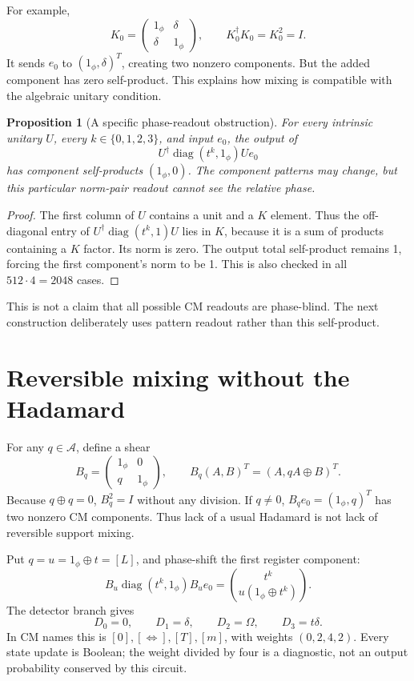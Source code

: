 \documentclass[11pt,a4paper]{article}
\newtheorem{proposition}[theorem]{Proposition}
\theoremstyle{definition}\newtheorem{definition}[theorem]{Definition}
\theoremstyle{remark}\newtheorem{remark}[theorem]{Remark}
\newcommand{\alg}{\mathcal A}
\newcommand{\diag}{\operatorname{diag}}
\newcommand{\cm}[4]{\begin{pmatrix}#1&#2\\#3&#4\end{pmatrix}}
\newcommand{\one}{1_{\phi}}
\numberwithin{equation}{section}
\begin{document}
For example,
\begin{equation}\label{eq:Kgate}
 K_0=\cm{\one}{\delta}{\delta}{\one},\qquad K_0^\dagger K_0=K_0^2=I.
\end{equation}
It sends $e_0$ to $(\one,\delta)^T$, creating two nonzero components. But the added component has zero self-product. This explains how mixing is compatible with the algebraic unitary condition.

\begin{proposition}[A specific phase-readout obstruction]\label{prop:unitaryblind}
For every intrinsic unitary $U$, every $k\in\{0,1,2,3\}$, and input $e_0$, the output of
\begin{equation}
 U^\dagger\diag(t^k,\one)Ue_0
\end{equation}
has component self-products $(\one,0)$. The component patterns may change, but this particular norm-pair readout cannot see the relative phase.
\end{proposition}
\begin{proof}
The first column of $U$ contains a unit and a $K$ element. Thus the off-diagonal entry of $U^\dagger\diag(t^k,1)U$ lies in $K$, because it is a sum of products containing a $K$ factor. Its norm is zero. The output total self-product remains 1, forcing the first component's norm to be 1. This is also checked in all $512\cdot4=2048$ cases.
\end{proof}
This is not a claim that all possible CM readouts are phase-blind. The next construction deliberately uses pattern readout rather than this self-product.

\section{Reversible mixing without the Hadamard}\label{sec:shears}
For any $q\in\alg$, define a shear
\begin{equation}\label{eq:shear}
 B_q=\cm{\one}0q{\one},\qquad B_q(A,B)^T=(A,qA\oplus B)^T.
\end{equation}
Because $q\oplus q=0$, $B_q^2=I$ without any division. If $q\ne0$, $B_qe_0=(\one,q)^T$ has two nonzero CM components. Thus lack of a usual Hadamard is not lack of reversible support mixing.

Put $q=u=\one\oplus t=[L]$, and phase-shift the first register component:
\begin{equation}\label{eq:shearphase}
 B_u\diag(t^k,\one)B_ue_0
 =\binom{t^k}{u(\one\oplus t^k)}.
\end{equation}
The detector branch gives
\begin{equation}\label{eq:shearoutputs}
 D_0=0,\qquad D_1=\delta,\qquad D_2=\Omega,\qquad D_3=t\delta.
\end{equation}
In CM names this is $[0],[\Leftrightarrow],[T],[m]$, with weights $(0,2,4,2)$. Every state update is Boolean; the weight divided by four is a diagnostic, not an output probability conserved by this circuit.
\end{document}
